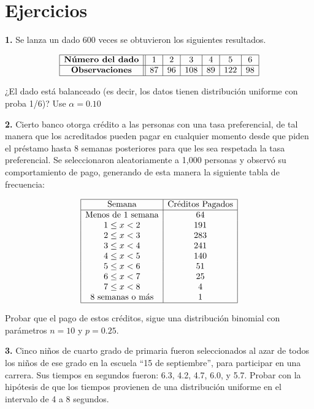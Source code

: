 \documentclass[
  a4paper,
  oneside,
  openany]{book}
\begin{document}
\hypertarget{ejercicios-3}{%
\chapter{Ejercicios}\label{ejercicios-3}}

\textbf{1.} Se lanza un dado 600 veces se obtuvieron los siguientes resultados.

\[
\begin{array}{|c ||c |c |c|c|c|c|}
\hline 
\textbf{Número del dado} & 1& 2& 3&4&5&6 \\
\hline 
\textbf{Observaciones} & 87 &  96 &108&89&122&98 \\
 \hline 
\end{array}
\]

¿El dado está balanceado (es decir, los datos tienen distribución uniforme con proba 1/6)? Use \(\alpha=0.10\)

\textbf{2.} Cierto banco otorga crédito a las personas con una tasa preferencial, de tal manera que los acreditados pueden pagar en cualquier momento desde que piden el préstamo hasta 8 semanas posteriores para que les sea respetada la tasa preferencial. Se seleccionaron aleatoriamente a 1,000 personas y observó su comportamiento de pago, generando de esta manera la siguiente tabla de frecuencia:

\[
\begin{array}{|c|c|  }
\hline
\mbox{Semana}& \mbox{Créditos Pagados}\\
\hline
\mbox{Menos de 1  semana} &64\\
1 \leq x < 2& 191\\
2 \leq  x < 3 &283\\
3 \leq  x < 4 &241\\
4 \leq  x < 5 &140\\
5 \leq  x < 6 &51\\
6 \leq  x < 7 &25\\
7 \leq  x < 8 &4\\
\mbox{8 semanas o más} & 1\\
\hline
\end{array}
\]

Probar que el pago de estos créditos, sigue una distribución binomial con parámetros \(n = 10\) y \(p = 0.25\).

\textbf{3.} Cinco niños de cuarto grado de primaria fueron seleccionados al azar de todos los niños de ese grado en la escuela ``15 de septiembre'', para participar en una carrera. Sus tiempos en segundos fueron: 6.3, 4.2, 4.7, 6.0, y 5.7. Probar con la hipótesis de que los tiempos provienen de una distribución uniforme en el intervalo de 4 a 8 segundos.
\end{document}
